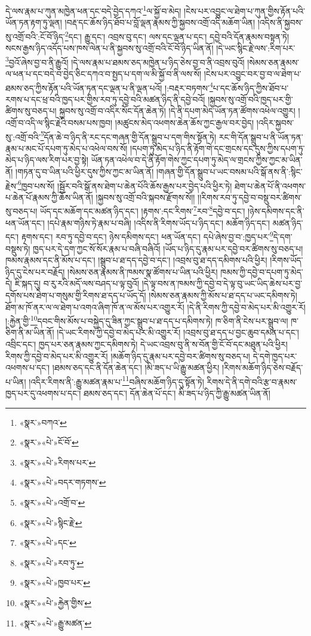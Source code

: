 དེ་ལས་རྣམ་པ་ཀུན་མཁྱེན་ཕན་དང་བདེ་བྱེད་དཀའ་\footnote{«སྣར་»བཀའ་}ལ་སྐྱོ་བ་མེད། །ངེས་པར་འབྱུང་ལ་ཐེག་པ་ཀུན་གྱིས་རྟོན་པའི་ཡོན་ཏན་རྟག་ཏུ་ལྡན། །བརྡ་དང་ཆོས་ཉིད་ཐོབ་པ་བློ་ལྡན་རྣམས་ཀྱི་སྐྱབས་འགྲོ་འདི་མཆོག་ཡིན། །འདིས་ནི་སྐྱབས་སུ་འགྲོ་བའི་:ངོ་བོ་ཉིད་\footnote{«སྣར་»«པེ་»ངོ་བོ་}དང་། རྒྱུ་དང་། འབྲས་བུ་དང་། ལས་དང་ལྡན་པ་དང་། དབྱེ་བའི་དོན་རྣམས་བསྟན་ཏེ། སངས་རྒྱས་ཉིད་འདོད་པས་ཁས་ལེན་པ་ནི་སྐྱབས་སུ་འགྲོ་བའི་ངོ་བོ་ཉིད་ཡིན་ནོ། །དེ་ཡང་སྙིང་རྗེ་ལས་:རིག་པར་\footnote{«སྣར་»«པེ་»རིགས་པར་}བྱའོ་ཞེས་བྱ་བ་ནི་རྒྱུའོ། །དེ་ལས་རྣམ་པ་ཐམས་ཅད་མཁྱེན་པ་ཉིད་ཅེས་བྱ་བ་ནི་འབྲས་བུའོ། །སེམས་ཅན་རྣམས་ལ་ཕན་པ་དང་བདེ་བ་བྱེད་ཅིང་དཀའ་བ་སྤྱད་པ་དག་ལ་མི་སྐྱོ་བ་ནི་ལས་སོ། །ངེས་པར་འབྱུང་བར་བྱ་བ་ལ་ཐེག་པ་ཐམས་ཅད་ཀྱིས་རྟོན་པའི་ཡོན་ཏན་དང་ལྡན་པ་ནི་ལྡན་པའོ། །:བརྡར་བཏགས་\footnote{«སྣར་»«པེ་»བདར་གཏགས་}པ་དང་ཆོས་ཉིད་ཀྱིས་ཐོབ་པ་རགས་པ་དང་ཕྲ་བའི་ཁྱད་པར་གྱིས་རབ་ཏུ་དབྱེ་བའི་མཚན་ཉིད་ནི་དབྱེ་བའོ། །སྐྱབས་སུ་འགྲོ་བའི་ཁྱད་པར་གྱི་ཚིགས་སུ་བཅད་པ། སྐྱབས་སུ་འགྲོ་བ་འདིར་སོང་དོན་ཆེན་ཏེ། །དེ་ནི་དཔག་མེད་ཡོན་ཏན་ཚོགས་འཕེལ་འགྱུར། །འགྲོ་བ་འདི་ལ་སྙིང་རྗེའི་བསམ་པས་ཁྱབ། །མཚུངས་མེད་འཕགས་ཆེན་ཆོས་ཀྱང་རྒྱལ་བར་བྱེད། །འདིར་སྐྱབས་སུ་:འགྲོ་བའི་\footnote{«སྣར་»«པེ་»འགྲོ་བ་}དོན་ཆེ་བ་ཉིད་ནི་རང་དང་གཞན་གྱི་དོན་སྒྲུབ་པ་དག་གིས་སྟོན་ཏེ། རང་གི་དོན་སྒྲུབ་པ་ནི་ཡོན་ཏན་རྣམ་པ་མང་པོ་དཔག་ཏུ་མེད་པ་འཕེལ་བས་སོ། །དཔག་ཏུ་མེད་པ་ཉིད་ནི་རྟོག་གེ་དང་གྲངས་དང་དུས་ཀྱིས་དཔག་ཏུ་མེད་པ་ཉིད་ལས་རིག་པར་བྱ་སྟེ། ཡོན་ཏན་འཕེལ་བ་དེ་ནི་རྟོག་གེས་ཀྱང་དཔག་ཏུ་མེད་ལ་གྲངས་ཀྱིས་ཀྱང་མ་ཡིན་ནོ། །གཏན་དུ་བ་ཡིན་པའི་ཕྱིར་དུས་ཀྱིས་ཀྱང་མ་ཡིན་ནོ། །གཞན་གྱི་དོན་སྒྲུབ་པ་ཡང་བསམ་པའི་སྒོ་ནས་ནི་:སྙིང་རྗེས་\footnote{«སྣར་»«པེ་»སྙིང་རྗེ་}ཁྱབ་པས་སོ། །སྦྱོར་བའི་སྒོ་ནས་ཐེག་པ་ཆེན་པོའི་ཆོས་རྒྱས་པར་བྱེད་པའི་ཕྱིར་ཏེ། ཐེག་པ་ཆེན་པོ་ནི་འཕགས་པ་ཆེན་པོ་རྣམས་ཀྱི་ཆོས་ཡིན་ནོ། །སྐྱབས་སུ་འགྲོ་བའི་སྐབས་རྫོགས་སོ།། །།རིགས་རབ་ཏུ་དབྱེ་བ་བསྡུ་བར་ཚིགས་སུ་བཅད་པ། ཡོད་དང་མཆོག་དང་མཚན་ཉིད་དང་། །རྟགས་:དང་རིགས་\footnote{«སྣར་»«པེ་»དང་}རབ་\footnote{«སྣར་»«པེ་»རབ་ཏུ་}དབྱེ་བ་དང་། །ཉེས་དམིགས་དང་ནི་ཕན་ཡོན་དང་། །དཔེ་རྣམ་གཉིས་ཏེ་རྣམ་པ་བཞི། །འདིས་ནི་རིགས་ཡོད་པ་ཉིད་དང་། མཆོག་ཉིད་དང་། མཚན་ཉིད་དང་། རྟགས་དང་། རབ་ཏུ་དབྱེ་བ་དང་། ཉེས་དམིགས་དང་། ཕན་ཡོན་དང་། དཔེ་ཞེས་བྱ་བ་:ཁྱད་པར་\footnote{«སྣར་»«པེ་»ཁྱབ་པར་}དེ་དག་བསྡུས་ཏེ། ཁྱད་པར་དེ་དག་ཀྱང་སོ་སོར་རྣམ་པ་བཞི་བཞིའོ། །ཡོད་པ་ཉིད་དུ་རྣམ་པར་དབྱེ་བར་ཚིགས་སུ་བཅད་པ། ཁམས་རྣམས་དང་ནི་མོས་པ་དང་། །སྒྲུབ་པ་ཐ་དད་དབྱེ་བ་དང་། །འབྲས་བུ་ཐ་དད་དམིགས་པའི་ཕྱིར། །རིགས་ཡོད་ཉིད་དུ་ངེས་པར་བརྗོད། །སེམས་ཅན་རྣམས་ནི་ཁམས་སྣ་ཚོགས་པ་ཡིན་པའི་ཕྱིར། ཁམས་ཀྱི་དབྱེ་བ་དཔག་ཏུ་མེད་དེ། ཇི་སྐད་དུ། བ་རུ་རའི་མདོ་ལས་བཤད་པ་ལྟ་བུའོ། །དེ་ལྟ་བས་ན་ཁམས་ཀྱི་དབྱེ་བ་དེ་ལྟ་བུ་ཡང་ཡིད་ཆེས་པར་བྱ་དགོས་པས་ཐེག་པ་གསུམ་གྱི་རིགས་ཐ་དད་པ་ཡོད་དོ། །སེམས་ཅན་རྣམས་ཀྱི་མོས་པ་ཐ་དད་པ་ཡང་དམིགས་ཏེ། ཐོག་མ་ཁོ་ནར་ལ་ལ་ཐེག་པ་འགའ་ཞིག་ཁོ་ན་ལ་མོས་པར་འགྱུར་རོ། །དེ་ནི་རིགས་ཀྱི་དབྱེ་བ་མེད་པར་མི་འགྱུར་རོ། །:རྐྱེན་གྱི་\footnote{«སྣར་»«པེ་»རྐྱེན་གྱིས་}དབང་གིས་མོས་པ་བསྐྱེད་དུ་ཟིན་ཀྱང་སྒྲུབ་པ་ཐ་དད་པ་དམིགས་ཏེ། ཁ་ཅིག་ནི་ངེས་པར་སྒྲུབ་ལ། ཁ་ཅིག་ནི་མ་ཡིན་ནོ། །དེ་ཡང་རིགས་ཀྱི་དབྱེ་བ་མེད་པར་མི་འགྱུར་རོ། །འབྲས་བུ་ཐ་དད་པ་བྱང་ཆུབ་དམན་པ་དང་། འབྲིང་དང་། ཁྱད་པར་ཅན་རྣམས་ཀྱང་དམིགས་ཏེ། དེ་ཡང་འབྲས་བུ་ནི་ས་བོན་གྱི་ངོ་བོ་དང་མཐུན་པའི་ཕྱིར། རིགས་ཀྱི་དབྱེ་བ་མེད་པར་མི་འགྱུར་རོ། །མཆོག་ཉིད་དུ་རྣམ་པར་དབྱེ་བར་ཚིགས་སུ་བཅད་པ། དེ་དགེ་ཁྱད་པར་འཕགས་པ་དང་། །ཐམས་ཅད་དང་ནི་དོན་ཆེན་དང་། །མི་ཟད་པ་ཡི་རྒྱུ་མཚན་ཕྱིར། །རིགས་མཆོག་ཉིད་ཅེས་བརྗོད་པ་ཡིན། །འདིར་རིགས་ནི་:རྒྱུ་མཚན་རྣམ་པ་\footnote{«སྣར་»«པེ་»རྒྱུ་མཚན་}བཞིས་མཆོག་ཉིད་དུ་སྟོན་ཏེ། རིགས་དེ་ནི་དགེ་བའི་རྩ་བ་རྣམས་ཁྱད་པར་དུ་འཕགས་པ་དང་། ཐམས་ཅད་དང་། དོན་ཆེན་པོ་དང་། མི་ཟད་པ་ཉིད་ཀྱི་རྒྱུ་མཚན་ཡིན་ནོ། 